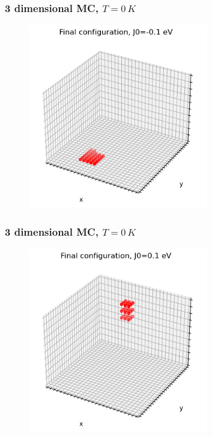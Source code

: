 \documentclass{beamer}
\begin{document}
\begin{frame}
    \frametitle{3 dimensional MC, $T=0\,K$}



    \begin{figure}
        \includegraphics[width=0.7\textwidth]{images/dconf-0.1.png}
    \end{figure}

\end{frame}

\begin{frame}
    \frametitle{3 dimensional MC, $T=0\,K$}



    \begin{figure}
        \includegraphics[width=0.7\textwidth]{images/dconf+0.1.png}
    \end{figure}

\end{frame}
\end{document}

